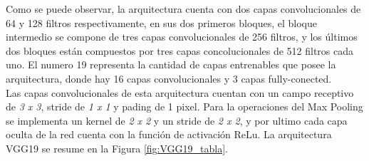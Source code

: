 				
				Como se puede observar, la arquitectura cuenta con dos capas convolucionales de 64 y 128 filtros respectivamente, en sus dos primeros bloques, el bloque intermedio se compone de tres capas convolucionales de 256 filtros, y los últimos dos bloques están compuestos por tres capas concolucionales de 512 filtros cada uno. El numero 19 representa la cantidad de capas entrenables que posee la arquitectura, donde hay 16 capas convolucionales y 3 capas fully-conected.\\			
					
				Las capas convolucionales de esta arquitectura cuentan con un campo receptivo de \textit{3 x 3}, stride de \textit{1 x 1} y pading de 1 pixel. Para la operaciones del Max Pooling se implementa un kernel de \textit{2 x 2} y un stride de \textit{2 x 2}, y por ultimo cada capa oculta de la red cuenta con la función de activación ReLu. La arquitectura VGG19 se resume en la Figura \ref{fig:VGG19_tabla}.
				
